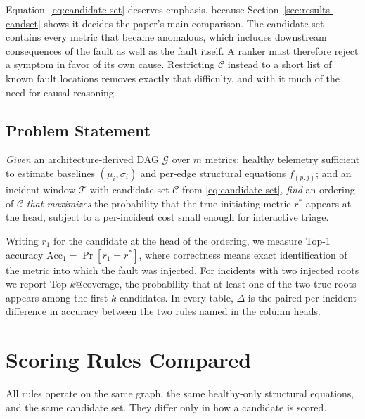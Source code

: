 \documentclass[conference]{IEEEtran}
\begin{document}
Equation~\eqref{eq:candidate-set} deserves emphasis, because Section~\ref{sec:results-candset} shows it decides the paper's main comparison. The candidate set contains every metric that became anomalous, which includes downstream consequences of the fault as well as the fault itself. A ranker must therefore reject a symptom in favor of its own cause. Restricting $\mathcal{C}$ instead to a short list of known fault locations removes exactly that difficulty, and with it much of the need for causal reasoning.

\subsection{Problem Statement}
\label{sec:problem}
\emph{Given} an architecture-derived DAG $\mathcal{G}$ over $m$ metrics; healthy telemetry sufficient to estimate baselines $(\mu_i,\sigma_i)$ and per-edge structural equations $f_{(p,j)}$; and an incident window $\mathcal{T}$ with candidate set $\mathcal{C}$ from \eqref{eq:candidate-set},
\emph{find} an ordering of $\mathcal{C}$
\emph{that maximizes} the probability that the true initiating metric $r^{*}$ appears at the head, subject to a per-incident cost small enough for interactive triage.

Writing $r_1$ for the candidate at the head of the ordering, we measure Top-1 accuracy $\mathrm{Acc}_1=\Pr[r_1=r^{*}]$, where correctness means exact identification of the metric into which the fault was injected. For incidents with two injected roots we report Top-$k$@coverage, the probability that at least one of the two true roots appears among the first $k$ candidates. In every table, $\Delta$ is the paired per-incident difference in accuracy between the two rules named in the column heads.

\section{Scoring Rules Compared}
\label{sec:method}
All rules operate on the same graph, the same healthy-only structural equations, and the same candidate set. They differ only in how a candidate is scored.
\end{document}
